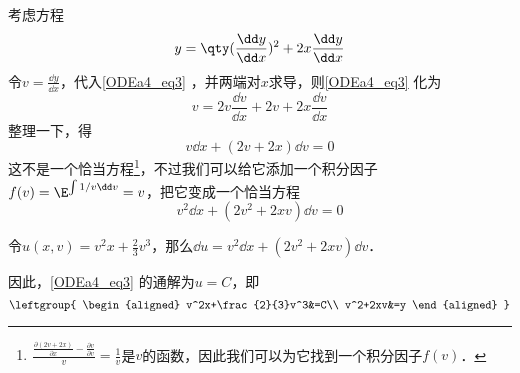 \begin{example}{}


考虑方程
\begin{equation}\label{ODEa4_eq3}
y=\qty(\frac{\dd y}{\dd x})^2+2x\frac{\dd y}{\dd x}
\end{equation}
令$v=\frac{\dd y}{\dd x}$，代入\autoref{ODEa4_eq3} ，并两端对$x$求导，则\autoref{ODEa4_eq3} 化为
\begin{equation}
v=2v\frac{\dd v}{\dd x}+2v+2x\frac{\dd v}{\dd x}
\end{equation}
整理一下，得
\begin{equation}
v\dd x+(2v+2x)\dd v=0
\end{equation}
这不是一个恰当方程\footnote{$\frac{\frac{\partial (2v+2x)}{\partial x}-\frac{\partial v}{\partial v}}{v}=\frac{1}{v}$是$v$的函数，因此我们可以为它找到一个积分因子$f(v)$．}，不过我们可以给它添加一个积分因子$f(v)=\E^{\int 1/v \dd v}=v$，把它变成一个恰当方程
\begin{equation}
v^2\dd x+(2v^2+2xv)\dd v=0
\end{equation}

令$u(x, v)=v^2x+\frac{2}{3}v^3$，那么$\dd u=v^2\dd x+(2v^2+2xv)\dd v$．

因此，\autoref{ODEa4_eq3} 的通解为$u=C$，即
\begin{equation}
\leftgroup{
    \begin{aligned}
    v^2x+\frac{2}{3}v^3&=C\\
    v^2+2xv&=y
    \end{aligned}
}
\end{equation}



\end{example}


